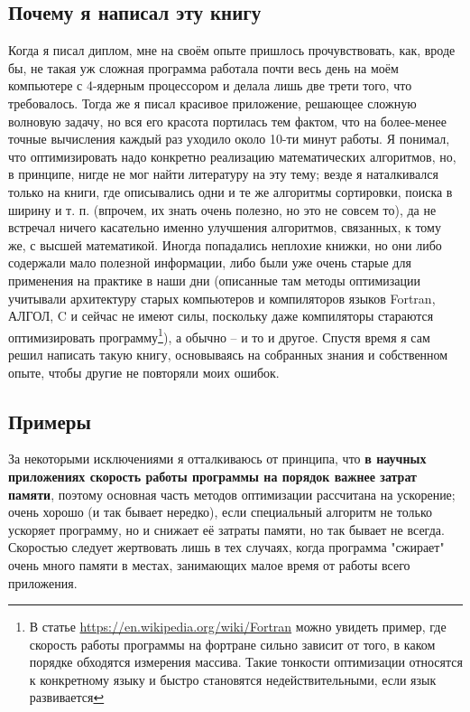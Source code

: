 \documentclass[a4paper, 12pt]{article}
\begin{document}
\subsection*{Почему я написал эту книгу}
Когда я писал диплом, мне на своём опыте пришлось прочувствовать, как, вроде бы, не такая уж сложная программа работала почти весь день на моём компьютере с 4-ядерным процессором и делала лишь две трети того, что требовалось.
Тогда же я писал красивое приложение, решающее сложную волновую задачу, но вся его красота портилась тем фактом, что на более-менее точные вычисления каждый раз уходило около 10-ти минут работы.
Я понимал, что оптимизировать надо конкретно реализацию математических алгоритмов, но, в принципе, нигде не мог найти литературу на эту тему; везде я наталкивался только на книги, где описывались одни и те же алгоритмы сортировки, поиска в ширину и т. п. (впрочем, их знать очень полезно, но это не совсем то), да не встречал ничего касательно именно улучшения алгоритмов, связанных, к тому же, с высшей математикой.
Иногда попадались неплохие книжки, но они либо содержали мало полезной информации, либо были уже очень старые  для применения на практике в наши дни (описанные там методы оптимизации учитывали архитектуру старых компьютеров и компиляторов языков Fortran, АЛГОЛ, C и сейчас не имеют силы, поскольку даже компиляторы стараются оптимизировать программу\footnote{В статье \url{https://en.wikipedia.org/wiki/Fortran} можно увидеть пример, где скорость работы программы на фортране сильно зависит от того, в каком порядке обходятся измерения массива. Такие тонкости оптимизации относятся к конкретному языку и быстро становятся недействительными, если язык развивается}), а обычно – и то и другое. Спустя время я сам решил написать такую книгу, основываясь на собранных знания и собственном опыте, чтобы другие не повторяли моих ошибок.   

\subsection*{Примеры}
За некоторыми исключениями я отталкиваюсь от принципа, что {\bf в научных приложениях скорость работы программы на порядок важнее затрат памяти}, поэтому основная часть методов оптимизации рассчитана на ускорение; очень хорошо (и так бывает нередко), если специальный алгоритм не только ускоряет программу, но и снижает её затраты памяти, но так бывает не всегда. Скоростью следует жертвовать лишь в тех случаях, когда программа "сжирает" очень много памяти в местах, занимающих малое время от работы всего приложения.
\end{document}
